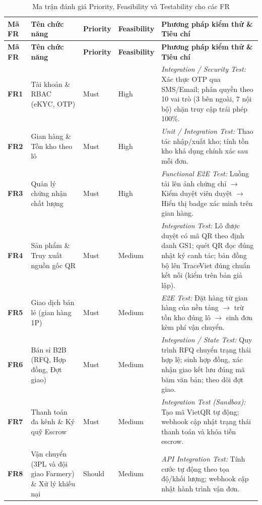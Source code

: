 \begingroup
\tblsetup\tblzebra
\begin{longtable}{L{1.52cm} L{4.20cm} >{\centering\arraybackslash}p{1.65cm} >{\centering\arraybackslash}p{2.00cm} L{4.82cm}}
\caption{Ma trận đánh giá Priority, Feasibility và Testability cho các FR}
\label{tab:fr-matrix} \\
\toprule
{}
\textbf{Mã FR} & \textbf{Tên chức năng} & \textbf{Priority} & \textbf{Feasibility} & \textbf{Phương pháp kiểm thử \& Tiêu chí} \\
\midrule
\endfirsthead
\toprule
{}
\textbf{Mã FR} & \textbf{Tên chức năng} & \textbf{Priority} & \textbf{Feasibility} & \textbf{Phương pháp kiểm thử \& Tiêu chí} \\
\midrule
\endhead
\bottomrule
\endfoot
\textbf{FR1} & Tài khoản \& RBAC (eKYC, OTP) & Must & High & \textit{Integration / Security Test:} Xác thực OTP qua SMS/Email; phân quyền theo 10 vai trò (3 bên ngoài, 7 nội bộ) chặn truy cập trái phép 100\%. \\
\textbf{FR2} & Gian hàng \& Tồn kho theo lô & Must & High & \textit{Unit / Integration Test:} Thao tác nhập/xuất kho; tính tồn kho khả dụng chính xác sau mỗi đơn. \\
\textbf{FR3} & Quản lý chứng nhận chất lượng & Must & High & \textit{Functional E2E Test:} Luồng tải lên ảnh chứng chỉ $\rightarrow$ Kiểm duyệt viên duyệt $\rightarrow$ Hiển thị badge xác minh trên gian hàng. \\
\textbf{FR4} & Sản phẩm \& Truy xuất nguồn gốc QR & Must & Medium & \textit{Integration Test:} Lô được duyệt có mã QR theo định danh GS1; quét QR đọc đúng nhật ký canh tác; bản đồng bộ lên TraceViet đúng chuẩn kết nối (kiểm trên bản giả lập). \\
\textbf{FR5} & Giao dịch bán lẻ (gian hàng 1P) & Must & Medium & \textit{E2E Test:} Đặt hàng từ gian hàng của nền tảng $\rightarrow$ trừ tồn kho đúng lô $\rightarrow$ sinh đơn kèm phí vận chuyển. \\
\textbf{FR6} & Bán sỉ B2B (RFQ, Hợp đồng, Đợt giao) & Must & Medium & \textit{Integration / State Test:} Quy trình RFQ chuyển trạng thái hợp lệ; sinh hợp đồng, xác nhận giao kết lưu đúng mã băm văn bản; theo dõi đợt giao. \\
\textbf{FR7} & Thanh toán đa kênh \& Ký quỹ Escrow & Must & Medium & \textit{Integration Test (Sandbox):} Tạo mã VietQR tự động; webhook cập nhật trạng thái thanh toán và khóa tiền escrow. \\
\textbf{FR8} & Vận chuyển (3PL và đội giao Farmery) \& Xử lý khiếu nại & Should & Medium & \textit{API Integration Test:} Tính cước tự động theo tọa độ/khối lượng; webhook cập nhật hành trình vận đơn. \\

\end{longtable}
